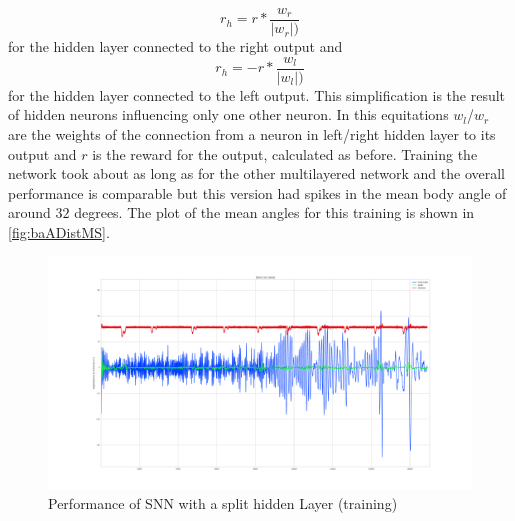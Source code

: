 \begin{equation}
r_h = r * \frac{w_r} {|w_r|)}
\end{equation}
for the hidden layer connected to the right output and
\begin{equation}
r_h = - r * \frac{w_l} {|w_l|)}
\end{equation}
for the hidden layer connected to the left output. This simplification is the result of hidden neurons influencing only one other neuron. In this equitations $w_l$/$w_r$ are the weights of the connection from a neuron in left/right hidden layer to its output and $r$ is the reward for the output, calculated as before.
Training the network took about as long as for the other multilayered network and the overall performance is comparable but this version had spikes in the mean body angle of around $32$ degrees. The plot of the mean angles for this training is shown in \autoref{fig:baADistMS}.
\begin{figure}[htpb]
  \centering
  \includegraphics[width=\textwidth]{figures/plots/baADistMS}
  \caption{ Performance of SNN with a split hidden Layer (training)  }
  \label{fig:baADistMS}
\end{figure}
